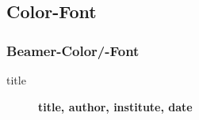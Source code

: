 \documentclass[11pt,pdf,aspectratio=43]{beamer}
\begin{document}
\subsection*{Color-Font}
\begin{frame}
    \frametitle{Beamer-Color/-Font}

    \begin{description}
	\item[title]	{\bf title, author, institute, date}
    \end{description}
\end{frame}

\end{document}

